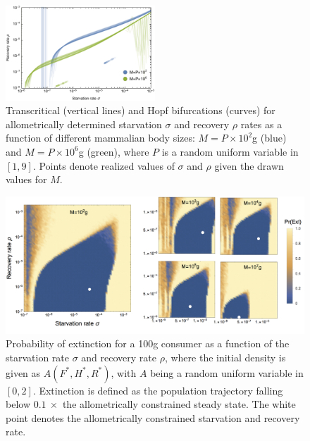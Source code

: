 \documentclass{pnastwo}
\begin{document}
\begin{figure}
\centering
\includegraphics[width=0.5\textwidth]{fig_DataHopf.pdf}
\caption{ Transcritical (vertical lines) and Hopf bifurcations (curves) for
  allometrically determined starvation $\sigma$ and recovery $\rho$ rates as
  a function of different mammalian body sizes: $M=P\times10^2$g (blue) and
  $M=P\times10^6$g (green), where $P$ is a random uniform variable in $[1,9]$.
  Points denote realized values of $\sigma$ and $\rho$ given the drawn values for $M$.
  }
\label{fig:hopf}
\end{figure}

\begin{figure}
\centering
\includegraphics[width=1\textwidth]{fig_ExtinctionAllometricComb2.png}
\caption{ Probability of extinction for a 100g consumer as a function of the starvation rate $\sigma$ and recovery rate $\rho$, where the initial density is given as $A(F^*,H^*,R^*)$, with
  $A$ being a random uniform variable in $[0,2]$.  Extinction is defined as the
  population trajectory falling below $0.1~\times$ the allometrically
  constrained steady state. The white point denotes the allometrically constrained starvation and recovery rate.}
\label{fig:ext}
\end{figure}
\end{document}
